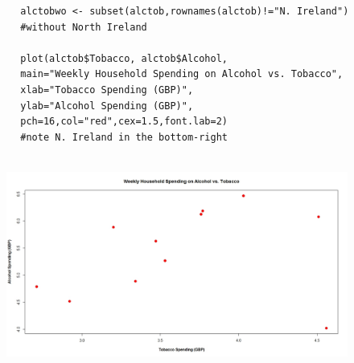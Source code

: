 \documentclass[main.tex]{subfiles}
\begin{document}
	
	\begin{framed}
		\begin{verbatim}
		alctobwo <- subset(alctob,rownames(alctob)!="N. Ireland") 
		#without North Ireland
		
		plot(alctob$Tobacco, alctob$Alcohol,
		main="Weekly Household Spending on Alcohol vs. Tobacco",
		xlab="Tobacco Spending (GBP)",
		ylab="Alcohol Spending (GBP)",
		pch=16,col="red",cex=1.5,font.lab=2) 
		#note N. Ireland in the bottom-right
		
		\end{verbatim}	
	\end{framed}
	\begin{figure}
		\centering
		\includegraphics[width=1.3\linewidth]{alcotob}
		\caption{}
		\label{fig:alcotob}
	\end{figure}
	
\end{document}
